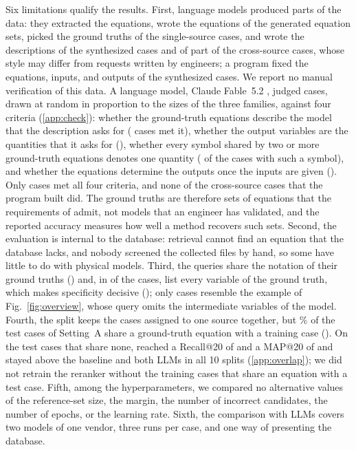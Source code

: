 Six limitations qualify the results. First, language models produced parts of the data: they
extracted the equations, wrote the \NEqRef{} equations of the generated equation sets, picked the ground
truths of the single-source cases, and wrote the descriptions of the synthesized cases and of part
of the cross-source cases, whose style may differ from requests written by engineers; a program
fixed the equations, inputs, and outputs of the synthesized cases. We report no manual verification
of this data. A language model, Claude Fable~5.2 \citep{ClaudeModels}, judged \NCheckCases{} cases,
drawn at random in proportion to the sizes of the three families, against four criteria
(\ref{app:check}): whether the ground-truth equations describe the model that the description asks
for (\NCheckOneYes{} cases met it), whether the output variables are the quantities that it asks
for (\NCheckTwoYes), whether every symbol shared by two or more ground-truth equations denotes one
quantity (\NCheckThreeYes{} of the \NCheckThreeApplicable{} cases with such a symbol), and whether
the equations determine the outputs once the inputs are given (\NCheckFourYes). Only \NCheckAllMet{} cases met all four criteria, and none of the \NCheckProgram{}
cross-source cases that the program built did. The ground truths are therefore sets of equations
that the requirements of  admit, not models that an engineer has
validated, and the reported accuracy measures how well a method recovers such sets.
Second, the evaluation is internal to the database: retrieval cannot find an equation that the
database lacks, and nobody screened the collected files by hand, so some have little to do with
physical models. Third, the queries share the notation of their ground truths
() and, in \NReqThreeTrivial{} of the \NCases{} cases, list every variable of
the ground truth, which makes specificity decisive (); only
\NWithIntermediate{} cases resemble the example of Fig.~\ref{fig:overview}, whose query omits the
intermediate variables of the model. Fourth, the split keeps the cases assigned to one source
together, but \ShareSharedEqA\% of the test cases of Setting~A share a ground-truth equation with a
training case (). On the test cases that share none, \ours{}
reached a Recall@20 of \RecANoShareProp{} and a MAP@20 of \MapTwANoShareProp{} and stayed above the
baseline and both LLMs in all 10 splits (\ref{app:overlap}); we did not retrain the reranker
without the training cases that share an equation with a test case. Fifth, among the hyperparameters, we compared no
alternative values of the reference-set size, the margin, the number of incorrect candidates, the
number of epochs, or the learning rate. Sixth, the comparison with LLMs covers two models of one
vendor, three runs per case, and one way of presenting the database.

\ifthesis{}\fi
